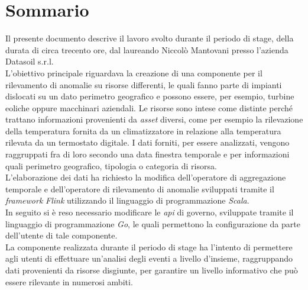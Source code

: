 
\cleardoublepage
{}
{}
\begingroup
\let\clearpage\relax
\let\cleardoublepage\relax
\let\cleardoublepage\relax

\chapter*{Sommario}

Il presente documento descrive il lavoro svolto durante il periodo di stage, della durata di circa trecento ore, dal laureando Niccolò Mantovani presso l'azienda Datasoil s.r.l.\\
L'obiettivo principale riguardava la creazione di una componente per il rilevamento di anomalie su risorse differenti, le quali fanno parte di impianti dislocati su un dato perimetro geografico e possono essere, per esempio, turbine eoliche oppure macchinari aziendali. Le risorse sono intese come distinte perché trattano informazioni provenienti da \textit{asset} diversi, come per esempio la rilevazione della temperatura fornita da un climatizzatore in relazione alla temperatura rilevata da un termostato digitale. I dati forniti, per essere analizzati, vengono raggruppati fra di loro secondo una data finestra temporale e per informazioni quali perimetro geografico, tipologia o categoria di risorsa.\\
L'elaborazione dei dati ha richiesto la modifica dell'operatore di aggregazione temporale e dell'operatore di rilevamento di anomalie sviluppati tramite il \textit{\textit{\gls{framework}}} \textit{Flink} utilizzando il linguaggio di programmazione \textit{Scala}.\\
In seguito si è reso necessario modificare le \textit{\gls{api}} di governo, sviluppate tramite il linguaggio di programmazione \textit{Go}, le quali permettono la configurazione da parte dell'utente di tale componente.\\
La componente realizzata durante il periodo di stage ha l'intento di permettere agli utenti di effettuare un'analisi degli eventi a livello d'insieme, raggruppando dati provenienti da risorse disgiunte, per garantire un livello informativo che può essere rilevante in numerosi ambiti.

%
%

\endgroup			

\vfill

